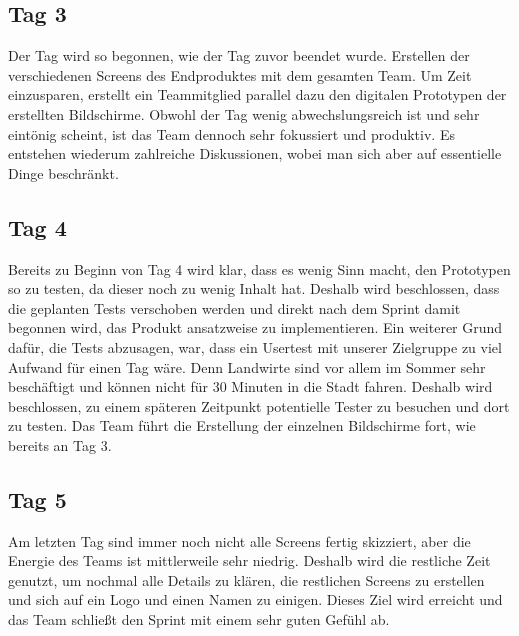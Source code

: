 \subsection*{Tag 3}
Der Tag wird so begonnen, wie der Tag zuvor beendet wurde. Erstellen der verschiedenen Screens des Endproduktes mit dem gesamten Team. Um Zeit einzusparen, erstellt ein Teammitglied parallel dazu den digitalen Prototypen der erstellten Bildschirme. Obwohl der Tag wenig abwechslungsreich ist und sehr eintönig scheint, ist das Team dennoch sehr fokussiert und produktiv. Es entstehen wiederum zahlreiche Diskussionen, wobei man sich aber auf essentielle Dinge beschränkt.

\subsection*{Tag 4}
Bereits zu Beginn von Tag 4 wird klar, dass es wenig Sinn macht, den Prototypen so zu testen, da dieser noch zu wenig Inhalt hat. Deshalb wird beschlossen, dass die geplanten Tests verschoben werden und direkt nach dem Sprint damit begonnen wird, das Produkt ansatzweise zu implementieren. Ein weiterer Grund dafür, die Tests abzusagen, war, dass ein Usertest mit unserer Zielgruppe zu viel Aufwand für einen Tag wäre. Denn Landwirte sind vor allem im Sommer sehr beschäftigt und können nicht für 30 Minuten in die Stadt fahren. Deshalb wird beschlossen, zu einem späteren Zeitpunkt potentielle Tester zu besuchen und dort zu testen. Das Team führt die Erstellung der einzelnen Bildschirme fort, wie bereits an Tag 3.

\subsection*{Tag 5}
Am letzten Tag sind immer noch nicht alle Screens fertig skizziert, aber die Energie des Teams ist mittlerweile sehr niedrig. Deshalb wird die restliche Zeit genutzt, um nochmal alle Details zu klären, die restlichen Screens zu erstellen und sich auf ein Logo und einen Namen zu einigen. Dieses Ziel wird erreicht und das Team schließt den Sprint mit einem sehr guten Gefühl ab.


